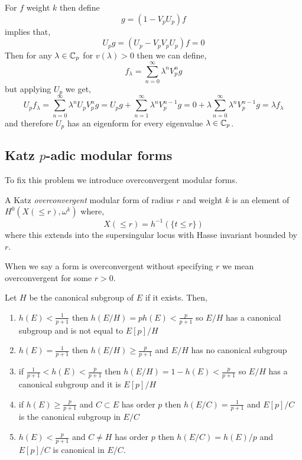 \documentclass[12pt]{article}
\begin{document}
For $f$ weight $k$ then define
\[ g = (1 - V_p U_p) f \]
implies that,
\[ U_p g = (U_p - V_p V_p U_p) f = 0 \]
Then for any $\lambda \in \mathbb{C}_p$ for $v(\lambda) > 0$ then we can define,
\[ f_\lambda = \sum_{n = 0}^\infty \lambda^n V_p^n g \]
but applying $U_p$ we get,
\[ U_p f_\lambda = \sum_{n = 0}^\infty \lambda^n U_p V_p^n g = U_p g + \sum_{n = 1}^\infty \lambda^n V_{p}^{n-1} g = 0 + \lambda \sum_{n = 0}^\infty \lambda^n V_p^{n-1} g = \lambda f_\lambda \]
and therefore $U_p$ has an eigenform for every eigenvalue $\lambda \in \mathbb{C}_p$. 

\subsection{Katz $p$-adic modular forms}

\begin{rmk}
To fix this problem we introduce overconvergent modular forms. 
\end{rmk}

\begin{defn}
A Katz \textit{overconvergent} modular form of radius $r$ and weight $k$ is an element of $H^0(X(\le r), \omega^k)$ where,
\[ X(\le r) = h^{-1}(\{ t \le r \}) \]
where this extends into the supersingular locus with Hasse invariant bounded by $r$. 
\end{defn}

\begin{rmk}
When we say a form is overconvergent without specifying $r$ we mean overconvergent for some $r > 0$. 
\end{rmk}

\begin{prop}
Let $H$ be the canonical subgroup of $E$ if it exists. Then,
\begin{enumerate}
\item $h(E) < \frac{1}{p+1}$ then $h(E/H) = p h(E) < \frac{p}{p+1}$ so $E/H$ has a canonical subgroup and is not equal to $E[p]/H$
\item $h(E) = \frac{1}{p+1}$ then $h(E/H) \ge \frac{p}{p+1}$ and $E/H$ has no canonical subgroup
\item if $\frac{1}{p+1} < h(E) < \frac{p}{p+1}$ then $h(E/H) = 1 - h(E) < \frac{p}{p+1}$ so $E/H$ has a canonical subgroup and it is $E[p]/H$
\item if $h(E) \ge \frac{p}{p+1}$ and $C \subset E$ has order $p$ then $h(E/C) = \frac{1}{p+1}$ and $E[p]/C$ is the canonical subgroup in $E/C$
\item $h(E) < \frac{p}{p+1}$ and $C \neq H$ has order $p$ then $h(E/C) = h(E)/p$ and $E[p]/C$ is canonical in $E/C$. 
\end{enumerate}
\end{prop}
\end{document}
